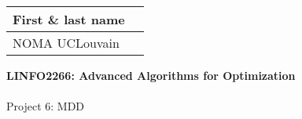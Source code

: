 \documentclass[12pt]{report}
\newcommand{\answerbox}[2]{\hfill\break\\
	\framebox[\linewidth]{\parbox[c][#1][c]{\dimexpr\linewidth-2\fboxsep-2\fboxrule}{#2}}
}
\begin{document}
	\hfill
	\begingroup
	\Large
	\begin{tabular}{|l|p{6cm}|}
		\hline
		First \& last name &
		\\ \hline
		NOMA UCLouvain &
		\\ \hline
	\end{tabular}
	\endgroup
	\vspace{1.5cm}

	\noindent
	\begingroup
	\Large
	\textbf{LINFO2266: Advanced Algorithms for Optimization}\\\\
	Project 6: MDD
	\endgroup
	\vspace{0.2cm}

\end{document}
